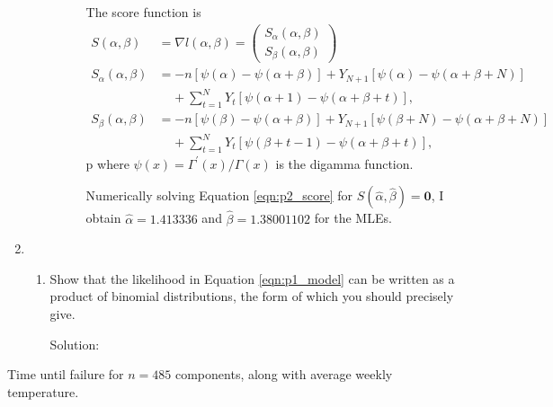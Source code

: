 \documentclass[letterpaper,11pt]{article}
\begin{document}
\begin{enumerate}
\begin{enumerate}
\begin{description}
        The score function is
        \begin{align}
          S\left(\alpha,\beta\right) &= 
          \nabla l\left(\alpha,\beta\right)
          = \begin{pmatrix}
            S_\alpha\left(\alpha,\beta\right) \\
            S_\beta\left(\alpha,\beta\right)
          \end{pmatrix} \label{eqn:p2_score}\\
          S_\alpha\left(\alpha,\beta\right)
          &= -n\left[
            \psi\left(\alpha\right) -
            \psi\left(\alpha + \beta\right)
            \right]
            + Y_{N+1}\left[
            \psi\left(\alpha\right)-
            \psi\left(\alpha + \beta + N\right)              
            \right] \nonumber\\
          &~~~~~+ \sum_{t=1}^N Y_{t}\left[
            \psi\left(\alpha + 1\right) -
            \psi\left(\alpha + \beta + t\right)            
            \right],
            \nonumber \\
          S_\beta\left(\alpha,\beta\right)
          &= -n\left[
            \psi\left(\beta\right) -
            \psi\left(\alpha + \beta\right)
            \right]
            + Y_{N+1}\left[
            \psi\left(\beta + N\right)-
            \psi\left(\alpha + \beta + N\right)              
            \right] \nonumber\\
          &~~~~~+ \sum_{t=1}^N Y_{t}\left[
            \psi\left(\beta + t - 1\right) -
            \psi\left(\alpha + \beta + t\right)            
            \right], \nonumber
        \end{align}p
        where
        $\psi\left(x\right) = \Gamma^\prime\left(x\right)/\Gamma\left(x\right)$
        is the digamma function.

        Numerically solving Equation \ref{eqn:p2_score} for
        $S\left(\hat\alpha,\hat\beta\right) = \mathbf{0}$, I obtain
        $\boxed{\hat\alpha = 1.413336}$ and $\boxed{\hat\beta = 1.38001102}$
        for the MLEs.
      \end{description}
    \end{enumerate}
  \item \begin{enumerate}
    \item Show that the likelihood in Equation \ref{eqn:p1_model} can be written
      as a product of binomial distributions, the form of which you should
      precisely give.

      \begin{description}
      \item[Solution:] 
      \end{description}
    \end{enumerate}
  \end{enumerate}

\begin{table}
  \centering
  
  \caption{Time until failure for $n = 485$ components, along with average weekly
    temperature.}
  \label{tab:failure_time_data}
\end{table}
\end{document}
